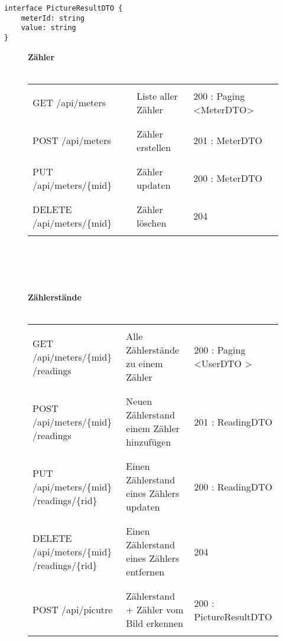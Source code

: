 \begin{lstlisting}
interface PictureResultDTO {
	meterId: string
	value: string
}
\end{lstlisting}

\begin{figure}[H]
	\textbf {Zähler} \\ \\
	\begin{tabularx}{\textwidth}{X | X | X}
		\hline &&\\
		GET /api/meters & Liste aller Zähler & 200 : Paging \textless MeterDTO\textgreater
		\\&&\\ \hline &&\\
		POST /api/meters & Zähler erstellen & 201 : MeterDTO
		\\&&\\ \hline &&\\
		PUT /api/meters/\{mid\} & Zähler updaten & 200 : MeterDTO
		\\&&\\ \hline &&\\
		DELETE /api/meters/\{mid\} & Zähler löschen & 204
		\\&&\\ \hline 
	\end{tabularx}
\\ \\ \\ \\

	\textbf{Zählerstände} \\ \\
	\begin{tabularx}{\textwidth}{X | X | X}
		\hline &&\\
		GET /api/meters/\{mid\} /readings & Alle Zählerstände zu einem Zähler & 200 : Paging \textless UserDTO \textgreater
		\\&&\\ \hline &&\\
		POST /api/meters/\{mid\} /readings & Neuen Zählerstand einem Zähler hinzufügen & 201 : ReadingDTO
		\\&&\\ \hline &&\\
		PUT /api/meters/\{mid\} /readings/\{rid\} & Einen Zählerstand eines Zählers updaten & 200 : ReadingDTO
		\\&&\\ \hline &&\\
		DELETE /api/meters/\{mid\} /readings/\{rid\} & Einen Zählerstand eines Zählers entfernen & 204
		\\&&\\ \hline &&\\
		POST /api/picutre & Zählerstand + Zähler vom Bild erkennen & 200 : PictureResultDTO 
		\\&&\\ \hline 
	\end{tabularx}

\end{figure}

